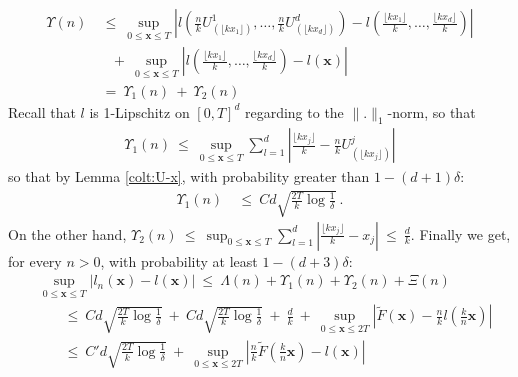 \begin{align*}
 \Upsilon(n) &~\le~  \sup_{0 \le \mathbf{x} \le T} \left| l \left(\frac{n}{k} U_{(\lfloor kx_1\rfloor )}^1,\ldots, \frac{n}{k} U_{(\lfloor kx_d\rfloor )}^d \right) - l(\frac{\lfloor kx_1\rfloor }{k},\ldots,\frac{\lfloor kx_d\rfloor }{k}) \right| 
\\&~~~ ~+~  \sup_{0 \le \mathbf{x} \le T} \left| l(\frac{\lfloor kx_1\rfloor }{k},\ldots,\frac{\lfloor kx_d\rfloor }{k})-l(\mathbf{x}) \right| 
\\&~=~ \Upsilon_1(n) ~+~ \Upsilon_2(n)
\end{align*}
\noindent
Recall that $l$ is 1-Lipschitz on $[0,T]^d$ regarding to the $\|.\|_1$-norm, so that
\begin{align*}
\Upsilon_1(n) ~\le~ \sup_{0 \le \mathbf{x} \le T}  \sum_{l=1}^{d} \left| \frac{\lfloor kx_j\rfloor }{k} - \frac{n}{k} U_{(\lfloor kx_j\rfloor )}^j \right| 
\end{align*}
\noindent
so that by Lemma \ref{colt:U-x}, with probability greater than $1-(d+1)\delta$:
\begin{align*}
\Upsilon_1(n) &~\le~  Cd \sqrt{\frac{2 T}{k}\log{\frac{1}{\delta}}}~.
\end{align*}
\noindent
On the other hand, $\Upsilon_2(n) ~\le~ \sup_{0 \le \mathbf{x} \le T} \sum_{l=1}^{d} \left|\frac{\lfloor k x_j\rfloor }{k} - x_j\right| ~\le~ \frac{d}{k}  $. 
Finally we get, for every $n >0$, with probability at least $1- (d+3)\delta$:
\begin{align*}
& \sup_{0 \le \mathbf{x} \le T} \left| l_n(\mathbf{x}) - l(\mathbf{x}) \right| ~\le~ \Lambda(n) + \Upsilon_1(n) + \Upsilon_2(n) + \Xi(n)
\\ &~~~~~~~~\le~  Cd\sqrt{\frac{2T}{k}\log\frac{1}{\delta}} ~+~ Cd\sqrt{\frac{2T}{k}\log\frac{1}{\delta}} ~+~ \frac{d}{k} ~+~\sup_{0 \le \mathbf{x} \le 2T}\left| \tilde F(\mathbf{x})-\frac{n}{k} l ( \frac{k}{n} \mathbf{x})\right|
\\ &~~~~~~~~\le~ C'd\sqrt{\frac{2T}{k}\log\frac{1}{\delta}} ~+~ \sup_{0 \le \mathbf{x} \le 2T}\left|\frac{n}{k} \tilde F(\frac{k}{n}\mathbf{x})- l ( \mathbf{x})\right|
\end{align*}










